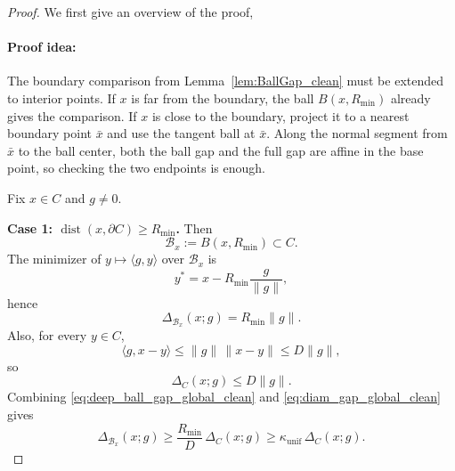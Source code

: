 \documentclass{article}
\begin{document}
\begin{proof}
We first give an overview of the proof,
\paragraph{Proof idea:}
The boundary comparison from Lemma~\ref{lem:BallGap_clean} must be extended to
interior points. If \(x\) is far from the boundary, the ball \(B(x,R_{\min})\)
already gives the comparison. If \(x\) is close to the boundary, project it to a
nearest boundary point \(\bar x\) and use the tangent ball at \(\bar x\). Along
the normal segment from \(\bar x\) to the ball center, both the ball gap and the
full gap are affine in the base point, so checking the two endpoints is enough.

\medskip

Fix \(x\in C\) and \(g\neq 0\).

\noindent\textbf{Case 1: $\operatorname{dist}(x,\partial C)\ge R_{\min}$.}
Then
\[
\mathcal B_x:=B(x,R_{\min})\subset C.
\]
The minimizer of $y\mapsto \langle g,y\rangle$ over $\mathcal B_x$ is
\[
y^*=x-R_{\min}\frac{g}{\|g\|},
\]
hence
\begin{equation}
\Delta_{\mathcal B_x}(x;g)=R_{\min}\|g\|.
\label{eq:deep_ball_gap_global_clean}
\end{equation}
Also, for every $y\in C$,
\[
\langle g,x-y\rangle\le \|g\|\,\|x-y\|\le D\|g\|,
\]
so
\begin{equation}
\Delta_C(x;g)\le D\|g\|.
\label{eq:diam_gap_global_clean}
\end{equation}
Combining \eqref{eq:deep_ball_gap_global_clean} and \eqref{eq:diam_gap_global_clean} gives
\[
\Delta_{\mathcal B_x}(x;g)\ge \frac{R_{\min}}{D}\,\Delta_C(x;g)\ge \kappa_{\mathrm{unif}}\,\Delta_C(x;g).
\]


\end{proof}
\end{document}
